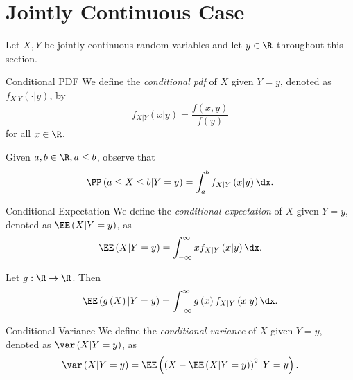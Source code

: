 \documentclass[stat333]{subfiles}
\begin{document}
    \section{Jointly Continuous Case}

    \np Let $X,Y$ be jointly continuous random variables and let $y\in\R$ throughout this section.
    
    \begin{definition}{Conditional PDF}{}
        We define the \emph{conditional pdf} of $X$ given $Y=y$, denoted as $f_{X|Y}\left( \cdot|y \right)$, by
        \begin{equation*}
            f_{X|Y}\left( x|y \right) = \frac{f\left( x,y \right)}{f\left( y \right)}
        \end{equation*}
        for all $x\in\R$.
    \end{definition}

    \np Given $a,b\in\R, a\leq b$, observe that
    \begin{equation*}
        \PP\left( a\leq X\leq b|Y=y \right) = \int^{b}_{a}f_{X|Y}\left( x|y \right)\dx.
    \end{equation*}

    \clearpage
    \begin{definition}{Conditional Expectation}{}
        We define the \emph{conditional expectation} of $X$ given $Y=y$, denoted as $\EE\left( X|Y=y \right)$, as
        \begin{equation*}
            \EE\left( X|Y=y \right) = \int^{\infty}_{-\infty}xf_{X|Y}\left( x|y \right)\dx.
        \end{equation*}
    \end{definition}

    \begin{prop}{}
        Let $g:\R\to\R$. Then
        \begin{equation*}
            \EE\left( g\left( X \right)|Y=y \right)=\int^{\infty}_{-\infty}g\left( x \right)f_{X|Y}\left( x|y \right)\dx.
        \end{equation*}
    \end{prop}

    \begin{definition}{Conditional Variance}{}
        We define the \emph{conditional variance} of $X$ given $Y=y$, denoted as $\var\left( X|Y=y \right)$, as
        \begin{equation*}
            \var\left( X|Y=y \right)=\EE\left( \left( X-\EE\left( X|Y=y \right) \right)^{2}|Y=y \right).
        \end{equation*}
    \end{definition}
\end{document}
